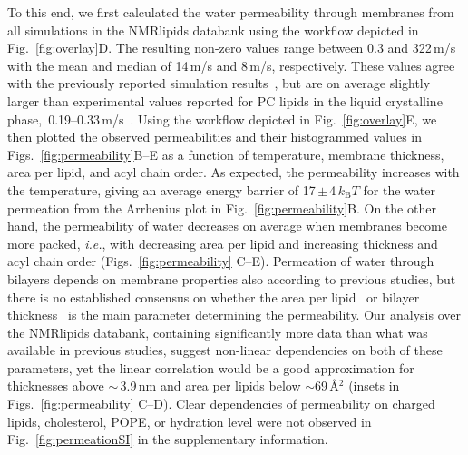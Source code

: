 \documentclass[fleqn,10pt]{wlscirep}
\begin{document}
To this end, we first calculated the water permeability through membranes from all simulations in the NMRlipids databank using the workflow depicted in Fig.~\ref{fig:overlay}D. The resulting non-zero values range between 0.3 and 322\,\textmu{}m/s with the mean and median of 14\,\textmu{}m/s and 8\,\textmu{}m/s, respectively. These values agree with the previously reported simulation results~\cite{venable19,camilo2022}, but are on average slightly larger than experimental values reported for PC lipids in the liquid crystalline phase,~0.19--0.33\,\textmu{}m/s~\cite{jansen95}. Using the workflow depicted in Fig.~\ref{fig:overlay}E, we then plotted the observed permeabilities and their histogrammed values in Figs.~\ref{fig:permeability}B--E as a function of temperature, membrane thickness, area per lipid, and acyl chain order. As expected, the permeability increases with the temperature, giving an average energy barrier of 17\,$\pm$\,4\,$k_\mathrm{B}T$ for the water permeation from the Arrhenius plot in Fig.~\ref{fig:permeability}B. On the other hand, the permeability of water decreases on average when membranes become more packed, \textit{i.e.}, with decreasing area per lipid and increasing thickness and acyl chain order (Figs.~\ref{fig:permeability} C--E). Permeation of water through bilayers depends on membrane properties also according to previous studies, but there is no established consensus on whether the area per lipid~\cite{nagle08} or bilayer thickness~\cite{frallicciardi22} is the main parameter determining the permeability. 
Our analysis over the NMRlipids databank, containing significantly more data than what was available in previous studies, suggest non-linear dependencies on both of these parameters, yet the linear correlation would be a good approximation for thicknesses above $\sim$\,3.9\,nm and area per lipids below $\sim$69\,\AA{}$^2$ (insets in Figs.~\ref{fig:permeability} C--D).
Clear dependencies of permeability on charged lipids, cholesterol, POPE, or hydration level were not observed in Fig.~\ref{fig:permeationSI} in the supplementary information.
%
\end{document}
